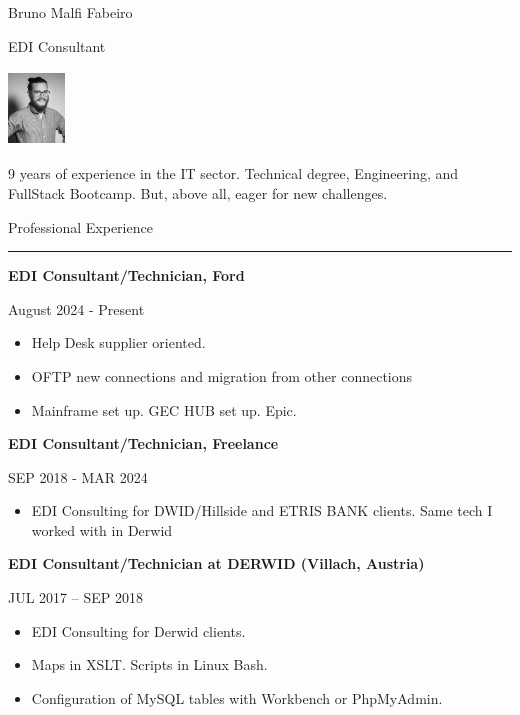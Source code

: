 \documentclass{letter}
\begin{document}
\begin{minipage}[t]{0.60\textwidth}
\setlength{\baselineskip}{1.5\baselineskip}
\vspace{0.8cm}

\begin{minipage}{0.8\linewidth} 
    {\huge Bruno Malfi Fabeiro}

    {\large EDI Consultant}
\end{minipage}
\begin{minipage}{0.1\linewidth}
    \includegraphics[width=1.5cm, height=2cm]{foto2.jpg}
\end{minipage}

\vspace{0.2cm}
 
9 years of experience in the IT sector.
Technical degree, Engineering, and FullStack Bootcamp.
But, above all, eager for new challenges.

\vspace{0.5cm}

{\large Professional Experience}
\rule{\linewidth}{0.4pt}
{\large \textbf{EDI Consultant/Technician, Ford}}

{\small August 2024 - Present}

\begin{itemize}
    \item Help Desk supplier oriented.
    \item OFTP new connections and migration from other connections
    \item Mainframe set up. GEC HUB set up. Epic. 
\end{itemize}

{\large \textbf{EDI Consultant/Technician, Freelance}}

{\small SEP 2018 - MAR 2024}

\begin{itemize}
    \item EDI Consulting for DWID/Hillside and ETRIS BANK clients. Same tech I worked with in Derwid
\end{itemize}

{\large \textbf{EDI Consultant/Technician at DERWID (Villach, Austria)}}

{\small JUL 2017 – SEP 2018}

\begin{itemize}
    \item EDI Consulting for Derwid clients.
    \item Maps in XSLT. Scripts in Linux Bash.
    \item Configuration of MySQL tables with Workbench or PhpMyAdmin.
\end{itemize}


\end{minipage}
\end{document}
